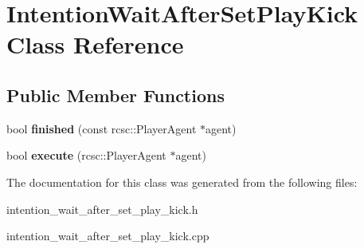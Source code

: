 \hypertarget{classIntentionWaitAfterSetPlayKick}{
\section{IntentionWaitAfterSetPlayKick Class Reference}
\label{classIntentionWaitAfterSetPlayKick}
}
\subsection*{Public Member Functions}
\begin{DoxyCompactItemize}
\item 
\hypertarget{classIntentionWaitAfterSetPlayKick_a0f290340303ff170f1af14f2a53f00e0}{
bool {\bfseries finished} (const rcsc::PlayerAgent $\ast$agent)}
\label{classIntentionWaitAfterSetPlayKick_a0f290340303ff170f1af14f2a53f00e0}

\item 
\hypertarget{classIntentionWaitAfterSetPlayKick_a82c891a1af6819a609f23d02fedf8e51}{
bool {\bfseries execute} (rcsc::PlayerAgent $\ast$agent)}
\label{classIntentionWaitAfterSetPlayKick_a82c891a1af6819a609f23d02fedf8e51}

\end{DoxyCompactItemize}


The documentation for this class was generated from the following files:\begin{DoxyCompactItemize}
\item 
intention\_\-wait\_\-after\_\-set\_\-play\_\-kick.h\item 
intention\_\-wait\_\-after\_\-set\_\-play\_\-kick.cpp\end{DoxyCompactItemize}
